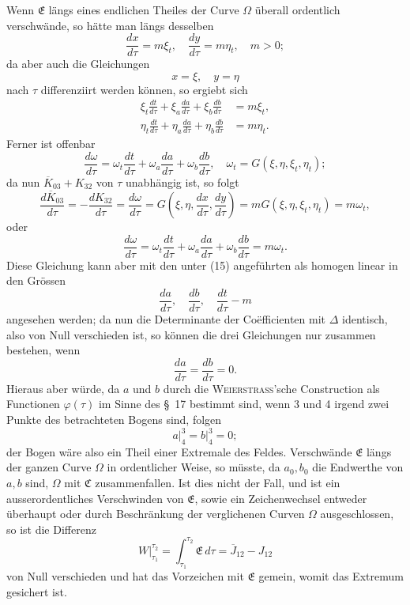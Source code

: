 \documentclass[11pt,a4paper,leqno]{article}
\begin{document}
Wenn $\mathfrak{E}$ längs eines endlichen Theiles der Curve $\Omega$ überall ordentlich verschwände, so hätte man längs desselben
\[
\frac{dx}{d\tau}=m\xi_t,
\quad
\frac{dy}{d\tau}=m\eta_t,
\quad
m>0;
\]
da aber auch die Gleichungen
\[
x=\xi,
\quad
 y=\eta
\]
nach $\tau$ differenziirt werden können, so ergiebt sich
\begin{equation}\tag{15}
\begin{aligned}
\xi_t\frac{dt}{d\tau}+\xi_a\frac{da}{d\tau}+\xi_b\frac{db}{d\tau}&=m\xi_t,\\
\eta_t\frac{dt}{d\tau}+\eta_a\frac{da}{d\tau}+\eta_b\frac{db}{d\tau}&=m\eta_t.
\end{aligned}
\end{equation}
Ferner ist offenbar
\[
\frac{d\omega}{d\tau}=\omega_t\frac{dt}{d\tau}+\omega_a\frac{da}{d\tau}+\omega_b\frac{db}{d\tau},
\quad
\omega_t=G(\xi,\eta,\xi_t,\eta_t);
\]
da nun $\overline{K}_{03}+K_{32}$ von $\tau$ unabhängig ist, so folgt
\[
\frac{d\overline{K}_{03}}{d\tau}=-\frac{dK_{32}}{d\tau}=\frac{d\omega}{d\tau}=G\left(\xi,\eta,\frac{dx}{d\tau},\frac{dy}{d\tau}\right)
=mG(\xi,\eta,\xi_t,\eta_t)=m\omega_t,
\]
oder
\[
\frac{d\omega}{d\tau}=\omega_t\frac{dt}{d\tau}+\omega_a\frac{da}{d\tau}+\omega_b\frac{db}{d\tau}=m\omega_t.
\]
Diese Gleichung kann aber mit den unter (15) angeführten als homogen linear in den Grössen
\[
\frac{da}{d\tau},
\quad
\frac{db}{d\tau},
\quad
\frac{dt}{d\tau}-m
\]
angesehen werden; da nun die Determinante der Coëfficienten mit $\Delta$ identisch, also von Null verschieden ist, so können die drei Gleichungen nur zusammen bestehen, wenn
\[
\frac{da}{d\tau}=\frac{db}{d\tau}=0.
\]
Hieraus aber würde, da $a$ und $b$ durch die \textsc{Weierstrass}'sche Construction als Functionen $\varphi(\tau)$ im Sinne des \S~17 bestimmt sind, wenn 3 und 4 irgend zwei Punkte des betrachteten Bogens sind, folgen
\[
a\bigg|_4^3=b\bigg|_4^3=0;
\]
der Bogen wäre also ein Theil einer Extremale des Feldes. Verschwände $\mathfrak{E}$ längs der ganzen Curve $\Omega$ in ordentlicher Weise, so müsste, da $a_0,b_0$ die Endwerthe von $a,b$ sind, $\Omega$ mit $\mathfrak{C}$ zusammenfallen. Ist dies nicht der Fall, und ist ein ausserordentliches Verschwinden von $\mathfrak{E}$, sowie ein Zeichenwechsel entweder überhaupt oder durch Beschränkung der verglichenen Curven $\Omega$ ausgeschlossen, so ist die Differenz
\[
W\bigg|_{\tau_1}^{\tau_2}=\int_{\tau_1}^{\tau_2}\mathfrak{E}\,d\tau=\overline{J}_{12}-J_{12}
\]
von Null verschieden und hat das Vorzeichen mit $\mathfrak{E}$ gemein, womit das Extremum gesichert ist.
\end{document}
